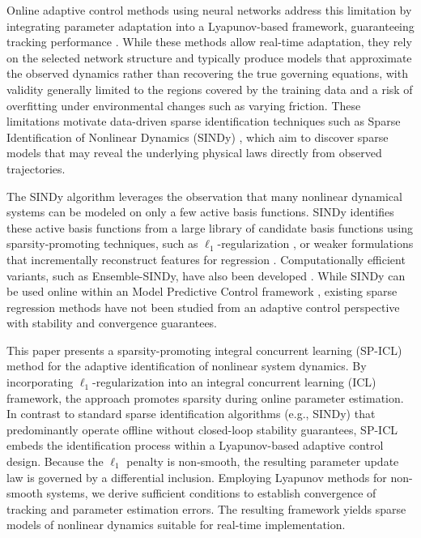 \documentclass[conference]{ieeeconf}
\begin{document}
Online adaptive control methods using neural networks address this limitation by integrating parameter adaptation into a Lyapunov-based framework, guaranteeing tracking performance \cite{Patil.Le.2021, Hart.Patil.2025, SCC.Shen.Xue.ea2025}. While these methods allow real-time adaptation, they rely on the selected network structure and typically produce models that approximate the observed dynamics rather than recovering the true governing equations, with validity generally limited to the regions covered by the training data and a risk of overfitting under environmental changes such as varying friction. These limitations motivate data-driven sparse identification techniques such as Sparse Identification of Nonlinear Dynamics (SINDy) \cite{Brunton2016}, which aim to discover sparse models that may reveal the underlying physical laws directly from observed trajectories.

The SINDy algorithm \cite{Brunton2016} leverages the observation that many nonlinear dynamical systems can be modeled on only a few active basis functions. SINDy identifies these active basis functions from a large library of candidate basis functions using sparsity-promoting techniques, such as $\ell_1$-regularization \cite{SCC.Istiqphara.Wahyunggoro.ea2024, SCC.MedaCampana.Sanchez.ea2025}, or weaker formulations that incrementally reconstruct features for regression \cite{SCC.Russo.Laiu.ea2025}. Computationally efficient variants, such as Ensemble-SINDy, have also been developed \cite{Fasel2022}. While SINDy can be used online within an Model Predictive Control framework \cite{Fasel2021, Fasel2022}, existing sparse regression methods have not been studied from an adaptive control perspective with stability and convergence guarantees.

This paper presents a sparsity-promoting integral concurrent learning (SP-ICL) method for the adaptive identification of nonlinear system dynamics. By incorporating $\ell_1$-regularization into an integral concurrent learning (ICL) framework, the approach promotes sparsity during online parameter estimation. In contrast to standard sparse identification algorithms (e.g., SINDy) that predominantly operate offline without closed-loop stability guarantees, SP-ICL embeds the identification process within a Lyapunov-based adaptive control design. Because the $\ell_1$ penalty is non-smooth, the resulting parameter update law is governed by a differential inclusion. Employing Lyapunov methods for non-smooth systems, we derive sufficient conditions to establish convergence of tracking and parameter estimation errors. The resulting framework yields sparse models of nonlinear dynamics suitable for real-time implementation. 
\end{document}
